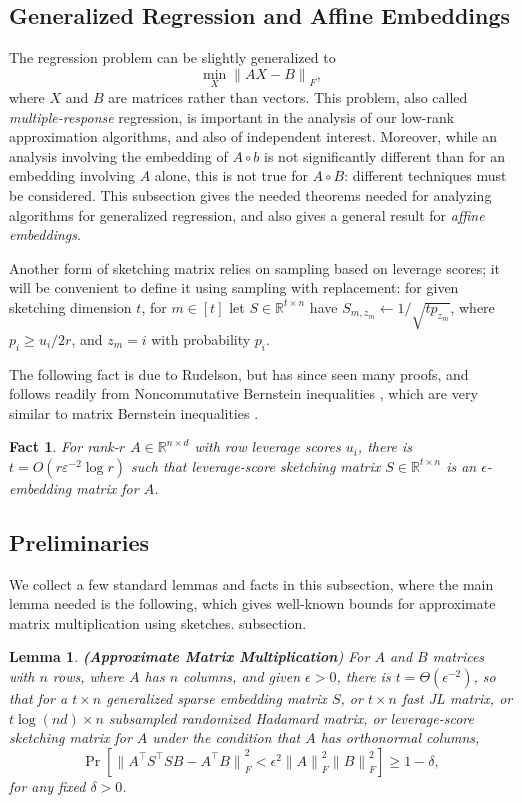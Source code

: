 \documentclass{sig-alternate}
\newcommand{\normF}[1]{{\| #1 \|}_F}
\newcommand{\ZZ}{S}
\newcommand{\eps}{\varepsilon}
\newcommand{\R}{{\mathbb R}}
\newtheorem{lemma}[theorem]{Lemma}
\newtheorem{fact}[theorem]{Fact}
\begin{document}
\subsection{Generalized Regression and Affine Embeddings}

The regression problem can be slightly generalized to
\[
\min_X \normF{AX-B},
\]
where $X$ and $B$ are matrices rather than vectors. This problem,
also called \emph{multiple-response} regression,
is important in the analysis of our low-rank approximation algorithms,
and also of independent interest. Moreover, while an analysis involving
the embedding of $A\circ b$ is not significantly different than for an embedding
involving $A$ alone, this is not true for $A\circ B$: different techniques must 
be considered. This subsection gives the needed theorems
needed for analyzing algorithms for generalized regression,
and also gives a general result for \emph{affine embeddings}.


Another form of sketching matrix relies on sampling based on leverage scores; it
will be convenient to define it using sampling with replacement: for 
given sketching dimension $t$, for $m\in [t]$ let $S\in\R^{t\times n}$ have
$S_{m, z_m} \gets 1/\sqrt{tp_{z_m}}$, where $p_i \ge u_i/2r$,
and $z_m = i$ with probability $p_i$.


The following fact is due to Rudelson\cite{Rudelson}, but has since seen many proofs,
and follows readily from Noncommutative Bernstein inequalities \cite{Recht},
which are very similar to matrix Bernstein inequalities \cite{Zouzias}.

\begin{fact}\label{fact:lev embed}
For rank-$r$ $A\in\R^{n\times d}$ with row leverage scores $u_i$,
there is $t=O(r\eps^{-2}\log r)$ such that leverage-score sketching matrix $S\in \R^{t\times n}$ is
an $\epsilon$-embedding matrix for $A$.
\end{fact}

\subsection{Preliminaries}

We collect a few standard lemmas and facts in this
\ifSTOC
subsection, where the main lemma needed is the following,
which gives well-known bounds for approximate matrix multiplication
using sketches.
\else
subsection.
\fi \begin{lemma}\label{lem:tail}{\bf (Approximate Matrix Multiplication})
For $A$ and $B$ matrices with $n$ rows, where $A$ has $n$ columns, and given
$\epsilon>0$, there is $t=\Theta(\epsilon^{-2})$,
so that for 
a $t \times n$ generalized sparse embedding matrix $\ZZ $,
or $t\times n$ fast JL matrix, or $t\log(nd)\times n$ subsampled randomized Hadamard matrix,
or leverage-score sketching matrix for $A$ under the condition
that $A$ has orthonormal columns,
\[
\Pr[\normF{A^\top \ZZ ^\top \ZZ B - A^\top B}^2 < \epsilon^2\normF{A}^2\normF{B}^2] \ge 1-\delta,
\]
for any fixed $\delta >0$.
\end{lemma}
\end{document}
